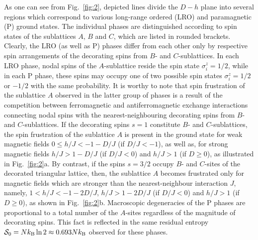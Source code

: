 \documentclass[final,5p,times,sort&compress]{elsarticle}
\begin{document}
As one can see from Fig.~\ref{fig:2}, depicted lines divide the $D-h$ plane into several regions which correspond to various long-range ordered (LRO) and paramagnetic (P) ground states. The individual phases are distinguished according to spin states of the sublattices $A$, $B$ and $C$, which are listed in rounded brackets. Clearly, the LRO (as well as P) phases differ from each other only by respective spin arrangements of the decorating spins from $B$- and $C$-sublattices. In each LRO phase, nodal spins of the $A$-sublattice  reside the spin state $\sigma_i^{z} = 1/2$, while in each P phase, these spins may occupy one of two possible spin states $\sigma_i^{z} = 1/2$ or $-1/2$ with the same probability. It is worthy to note that spin frustration of the sublattice $A$ observed in the latter group of phases is a result of the competition between ferromagnetic and antiferromagnetic exchange interactions connecting nodal spins with the nearest-neighbouring decorating spins from $B$- and $C$-sublattices. If the decorating spins $s=1$ constitute $B$- and $C$-sublattices, the spin frustration of the sublattice $A$ is present in the ground state for weak magnetic fields $0\leq h/J < -1 - D/J$ (if $D/J<-1$), as well as, for strong magnetic fields $h/J > 1 - D/J$ (if $D/J<0$) and $h/J > 1$ (if $D\geq0$), as illustrated in Fig.~\ref{fig:2}a. By contrast, if the spins $s=3/2$ occupy $B$- and $C$-sites of the decorated triangular lattice, then, the sublattice $A$ becomes frustrated only for magnetic fields which are stronger than the nearest-neighbour interaction $J$, namely, $1<h/J<-1-2D/J$, $h/J>1-2D/J$ (if $D/J<0$) and $h/J > 1$ (if $D\geq0$), as shown in Fig.~\ref{fig:2}b. Macroscopic degeneracies of the P phases are proportional to a total number of the $A$-sites regardless of the magnitude of decorating spins. This fact is reflected in the same residual entropy ${\cal S}_{0} = Nk_{\rm B}\ln 2\approx 0.693Nk_{\rm B}$ observed for these phases.
\end{document}

